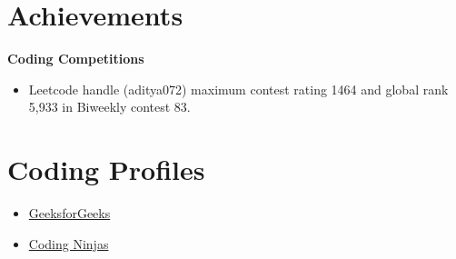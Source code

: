 \documentclass[letterpaper,11pt]{article}
\makeatletter
\newcommand{\resumeItem}[1]{
  \item\small{
    {#1 \vspace{-2pt}}
  }
}
\newcommand{\resumeSubheading}[4]{
  \vspace{-2pt}\item
    \begin{tabular*}{1.0\textwidth}[t]{l@{\extracolsep{\fill}}r}
      \textbf{#1} & \textbf{\small #2} \\
      {\small#3} & {\small #4} \\
    \end{tabular*}\vspace{-7pt}
}
\newcommand{\resumeSubHeadingListStart}{\begin{itemize}[leftmargin=0.0in, label={}]}
\newcommand{\resumeSubHeadingListEnd}{\end{itemize}}
\newcommand{\resumeItemListStart}{\begin{itemize}}
\newcommand{\resumeItemListEnd}{\end{itemize}\vspace{-5pt}}
\makeatother
\begin{document}
\section{Achievements}
 {\textbf{Coding Competitions}} \vspace{-5pt}
\resumeItemListStart
\resumeItem{Leetcode handle (aditya072) maximum contest rating 1464 and global rank 5,933 in Biweekly contest 83.}
\resumeItemListEnd
\vspace{-10pt}

\section{Coding Profiles}
\resumeItemListStart
\resumeItem{\href{https://auth.geeksforgeeks.org/user/aditya072/}{\color{blue}GeeksforGeeks}}
\resumeItem{\href{https://www.codingninjas.com/studio/profile/aditya072}{\color{blue}Coding Ninjas}}
\resumeItemListEnd


\end{document}
